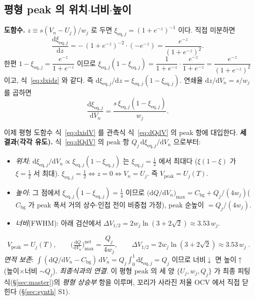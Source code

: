 \documentclass[11pt,a4paper]{article}
\newcommand{\dd}{\mathrm{d}}
\newcommand{\eq}{\mathrm{eq}}
\newcommand{\bg}{\mathrm{bg}}
\newcommand{\peak}{\mathrm{peak}}
\begin{document}
\subsection{평형 peak 의 위치$\cdot$너비$\cdot$높이}
\textbf{도함수.} $z\equiv s(V_n-U_j)/w_j$ 로 두면 $\xi_{\eq,j}=(1+e^{-z})^{-1}$ 이다. 직접 미분하면
\begin{equation}
\frac{\dd\xi_{\eq,j}}{\dd z}=-\,(1+e^{-z})^{-2}\cdot(-e^{-z})=\frac{e^{-z}}{(1+e^{-z})^2}.
\label{eq:dxidz}
\end{equation}
한편 $1-\xi_{\eq,j}=\dfrac{e^{-z}}{1+e^{-z}}$ 이므로 $\xi_{\eq,j}(1-\xi_{\eq,j})=\dfrac{1}{1+e^{-z}}\cdot
\dfrac{e^{-z}}{1+e^{-z}}=\dfrac{e^{-z}}{(1+e^{-z})^2}$ 이고, 식~\eqref{eq:dxidz} 와 같다. 즉
$\dd\xi_{\eq,j}/\dd z=\xi_{\eq,j}(1-\xi_{\eq,j})$. 연쇄율 $\dd z/\dd V_n=s/w_j$ 를 곱하면
\begin{equation}
\frac{\dd\xi_{\eq,j}}{\dd V_n}=\frac{s\,\xi_{\eq,j}(1-\xi_{\eq,j})}{w_j}.
\label{eq:dxidV}
\end{equation}

이제 평형 도함수 식~\eqref{eq:dxidV} 를 관측식 식~\eqref{eq:dQdV} 의 peak 항에 대입한다.
\textbf{세 결과(각각 유도).} 식~\eqref{eq:dQdV} 의 peak 항 $Q_j\,\dd\xi_{\eq,j}/\dd V_n$ 으로부터:
\begin{itemize}[leftmargin=1.6em,itemsep=2pt]
\item \emph{위치}: $\dd\xi_{\eq,j}/\dd V_n\propto\xi_{\eq,j}(1-\xi_{\eq,j})$ 는 $\xi_{\eq,j}=\tfrac12$ 에서 최대다
  ($\xi(1-\xi)$ 가 $\xi=\tfrac12$ 서 최대). $\xi_{\eq,j}=\tfrac12\Leftrightarrow z=0\Leftrightarrow V_n=U_j$. 즉
  $V_\peak=U_j(T)$.
\item \emph{높이}: 그 점에서 $\xi_{\eq,j}(1-\xi_{\eq,j})=\tfrac14$ 이므로
  $\big(\dd Q/\dd V_n\big)_{\max}=C_\bg+Q_j/(4w_j)$($C_\bg$ 가 peak 폭서 거의 상수$\cdot$인접 전이 비중첩 가정), peak 순높이 $=Q_j/(4w_j)$.
\item \emph{너비}(FWHM): 아래 검산에서 $\Delta V_{1/2}=2w_j\ln(3+2\sqrt2)\approx3.53\,w_j$.
\end{itemize}
\begin{equation}
\boxed{\;V_\peak=U_j(T),\qquad \Big(\tfrac{\dd Q}{\dd V_n}\Big)^{\text{net}}_{\max}=\frac{Q_j}{4w_j},\qquad
\Delta V_{1/2}=2w_j\ln(3+2\sqrt2)\approx3.53\,w_j\;.}
\label{eq:eqpeak}
\end{equation}
\emph{면적 보존}: $\int(\dd Q/\dd V_n-C_\bg)\,\dd V_n=Q_j\int_0^1\dd\xi_{\eq,j}=Q_j$ 이므로 너비$\downarrow$ 면
높이$\uparrow$(높이$\times$너비 $\sim Q_j$). \emph{최종식과의 연결.} 이 평형 peak 의 세 양 $\{U_j,w_j,Q_j\}$ 가
최종 피팅식(\S\ref{sec:master})의 \emph{평형 상승부} 항을 이루며, 꼬리가 사라진 저율 OCV 에서 직접 닫힌다
(\S\ref{sec:synth} S1).
\end{document}
